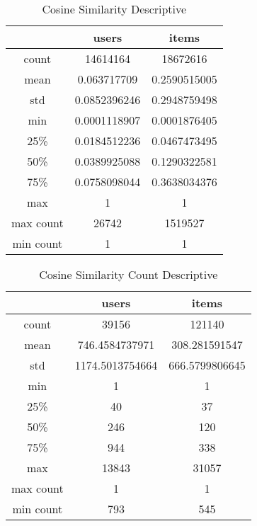 \begin{table}[H]
\centering
\caption{Cosine Similarity Descriptive}
\label{table:cosine_similarity_descriptive}
\begin{tabular}{|c|c|c|}
\hline
		  & \textbf{users} & \textbf{items} \\ \hline
count     & 14614164       & 18672616       \\ \hline
mean      & 0.063717709    & 0.2590515005   \\ \hline
std       & 0.0852396246   & 0.2948759498   \\ \hline
min       & 0.0001118907   & 0.0001876405   \\ \hline
25\%      & 0.0184512236   & 0.0467473495   \\ \hline
50\%      & 0.0389925088   & 0.1290322581   \\ \hline
75\%      & 0.0758098044   & 0.3638034376   \\ \hline
max       & 1              & 1              \\ \hline
max count & 26742          & 1519527        \\ \hline
min count & 1              & 1              \\ \hline
\end{tabular}
\end{table}

\begin{table}[H]
\centering
\caption{Cosine Similarity Count Descriptive}
\label{table:cosine_similarity_count_descriptive}
\begin{tabular}{|c|c|c|}
\hline
          & \textbf{users}  & \textbf{items} \\ \hline
count     & 39156           & 121140         \\ \hline
mean      & 746.4584737971  & 308.281591547  \\ \hline
std       & 1174.5013754664 & 666.5799806645 \\ \hline
min       & 1               & 1              \\ \hline
25\%      & 40              & 37             \\ \hline
50\%      & 246             & 120            \\ \hline
75\%      & 944             & 338            \\ \hline
max       & 13843           & 31057          \\ \hline
max count & 1               & 1              \\ \hline
min count & 793             & 545            \\ \hline
\end{tabular}
\end{table}

